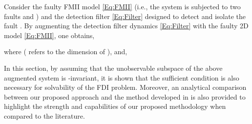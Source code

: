 \documentclass[journal,12pt,draftcls,onecolumn]{IEEEtran}
\newcommand{\bs}{\begin{small}}
\newcommand{\es}{\end{small}}
\begin{document}
Consider the faulty FMII model \eqref{Eq:FMII} (i.e., the system is subjected to two faults  and ) and the detection filter \eqref{Eq:Filter} designed to detect and isolate the fault . By augmenting the detection filter dynamics \eqref{Eq:Filter} with the faulty 2D model \eqref{Eq:FMII}, one obtains,
\bs

\es
where  ( refers to the dimension of ),  and,
\bs

\es
In this section, by assuming that the unobservable subspace of the above augmented system is -invariant, it is shown that the sufficient condition is also necessary for solvability of the FDI problem. Moreover, an analytical  comparison between our proposed approach and the method developed in \cite{Malek_3DFDI} is also provided to highlight the strength and capabilities of our proposed methodology when compared to the literature.
\end{document}
